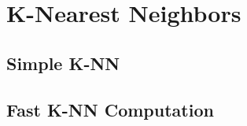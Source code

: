 
\chapter{K-Nearest Neighbors}
\label{chapter5}

\section{Simple K-NN}

\section{Fast K-NN Computation}
